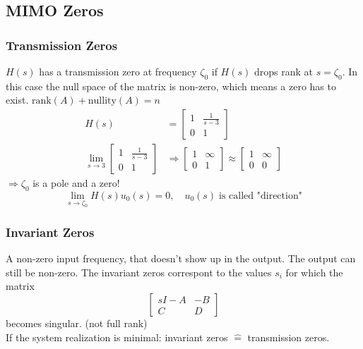 \subsection{MIMO Zeros}
\subsubsection{Transmission Zeros}
    $H(s)$ has a transmission zero at frequency $\zeta_0$ if $H(s)$ drops rank at $s = \zeta_0$. In this case the null space of the matrix is non-zero, which means a zero has to exist. $\textrm{rank}(A)+\textrm{nullity}(A)=n$
    \begin{align*}
        H(s) &= \begin{bmatrix}
                    1 & \frac{1}{s-3} \\
                    0 & 1
                \end{bmatrix}\\
        \lim_{s\rightarrow 3} \begin{bmatrix}
                                1 & \frac{1}{s-3} \\
                                0 & 1
                              \end{bmatrix}
        &\Rightarrow \begin{bmatrix}
                        1 & \infty \\
                        0 & 1
                    \end{bmatrix}
        \approx \begin{bmatrix}
                    1 & \infty \\
                    0 & 0
                \end{bmatrix}
    \end{align*}
    \quad $\Longrightarrow \zeta_0$ is a pole and a zero!
    $$
    \lim_{s\rightarrow \zeta_0} H(s)u_0(s) = 0, \quad u_0(s) \; \text{is called "direction"}
    $$

\subsubsection{Invariant Zeros}
    A non-zero input frequency, that doesn't show up in the output. The output can still be non-zero. The invariant zeros correspont to the values $s_i$ for which the matrix
    $$
    \begin{bmatrix}
        sI-A & -B \\
        C & D
    \end{bmatrix}
    $$
    becomes singular. (not full rank)\\
    If the system realization is minimal: invariant zeros $\hat{=}$ transmission zeros.